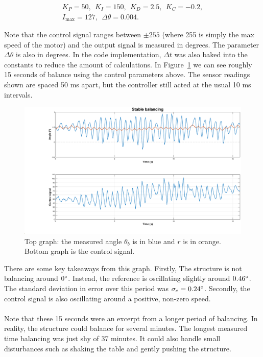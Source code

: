 \begin{equation}
    \begin{gathered}
        K_P = 50, \ \ K_I = 150, \ \ K_D = 2.5, \ \ K_C=-0.2, \\
        I_{\text{max}} = 127, \ \ \Delta \theta = 0.004.
    \end{gathered}
\end{equation}

\noindent
Note that the control signal ranges between $\pm255$ (where 255 is simply the max speed of the motor) and the output signal is measured in degrees. The parameter $\Delta \theta$ is also in degrees. In the code implementation, $\Delta t$ was also baked into the constants to reduce the amount of calculations. In Figure~\ref{fig:physical-balance} we can see roughly 15 seconds of balance using the control parameters above. The sensor readings shown are spaced 50 ms apart, but the controller still acted at the usual 10 ms intervals.

\begin{figure}[H]
    \centering
    \includegraphics[width=1.2\linewidth, center]{figures/balance_with_u.eps}
    \caption{Top graph: the measured angle $\theta_b$ is in blue and $r$ is in orange. Bottom graph is the control signal.}
    \label{fig:physical-balance}
\end{figure}

\noindent
There are some key takeaways from this graph. Firstly, The structure is not balancing around $0\degree$. Instead, the reference is oscillating slightly around $0.46\degree$. The standard deviation in error over this period was $\sigma_e = 0.24\degree$. Secondly, the control signal is also oscillating around a positive, non-zero speed.
\\\\
Note that these 15 seconds were an excerpt from a longer period of balancing. In reality, the structure could balance for several minutes. The longest measured time balancing was just shy of 37 minutes. It could also handle small disturbances such as shaking the table and gently pushing the structure.

